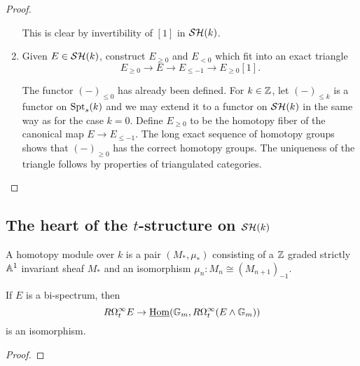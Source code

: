\documentclass{amsart}%
\begin{document}
\begin{proof}
\begin{enumerate}
  This is clear by invertibility of $[1]$ in $\mathcal{SH}(k)$.

    \item Given $E \in \mathcal{SH}(k)$, construct $E_{\geq 0}$ and $E_{<0}$
  which fit into an exact triangle
  \begin{equation*}
    E_{\geq 0} \to E \to E_{\leq -1} \to E_{\geq 0}[1].
  \end{equation*}

  The functor $(-)_{\leq 0}$ has already been defined. For $k\in\mathbb{Z}$,
  let $(-)_{\leq k}$ is a functor on $\mathrm{Spt}_s(k)$ and we may extend it
  to a functor on $\mathcal{SH}(k)$ in the same way as for the case
  $k=0$. Define $E_{\geq 0}$ to be the homotopy fiber of the canonical
  map $E \to E_{\leq -1}$. The long exact sequence of homotopy groups
  shows that $(-)_{\geq 0}$ has the correct homotopy groups. The
  uniqueness of the triangle follows by properties of triangulated
  categories. 
\end{enumerate}
\end{proof}

\subsection{The heart of the $t$-structure on $\mathcal{SH}(k)$}

\begin{definition}
  A homotopy module over $k$ is a pair $(M_*, \mu_*)$ consisting of a
  $\mathbb{Z}$ graded strictly $\mathbb{A}^1$ invariant sheaf $M_*$ and an
  isomorphism $\mu_n : M_n \cong (M_{n+1})_{-1}$. 
\end{definition}

\begin{lemma}
  If $E$ is a bi-spectrum, then 
  \begin{equation*}
    R\Omega^{\infty}_t E \to \underline{\operatorname{Hom}}(\mathbb{G}_m, R\Omega^{\infty}_t(E\wedge \mathbb{G}_m))
  \end{equation*}
  is an isomorphism.
\end{lemma}

\begin{proof}
  
\end{proof}
\end{document}
